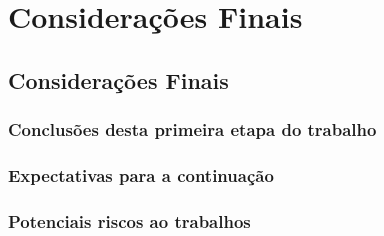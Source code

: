 \part{Considerações Finais}

\chapter[Considerações Finais]{Considerações Finais}

\section{Conclusões desta primeira etapa do trabalho}
\section{Expectativas para a continuação}
\section{Potenciais riscos ao trabalhos}
